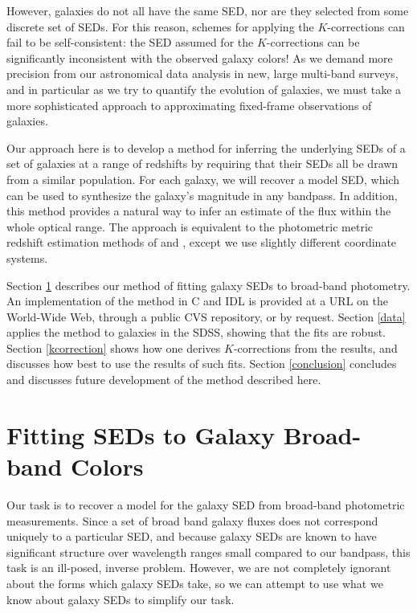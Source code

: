\documentclass[10pt,preprint]{aastex}
\begin{document}
However, galaxies do not all have the same SED, nor are they selected
from some discrete set of SEDs. For this reason, schemes for applying
the $K$-corrections can fail to be self-consistent: the SED assumed
for the $K$-corrections can be significantly inconsistent with the
observed galaxy colors! As we demand more precision from our
astronomical data analysis in new, large multi-band surveys, and in
particular as we try to quantify the evolution of galaxies, we must
take a more sophisticated approach to approximating fixed-frame
observations of galaxies.

Our approach here is to develop a method for inferring the underlying
SEDs of a set of galaxies at a range of redshifts by requiring that
their SEDs all be drawn from a similar population. For each galaxy, we
will recover a model SED, which can be used to synthesize the galaxy's
magnitude in any bandpass. In addition, this method provides a natural
way to infer an estimate of the flux within the whole optical range.
The approach is equivalent to the photometric metric redshift
estimation methods of \citet{csabai99a} and \citet{budavari00a}, 
except we use slightly different coordinate systems.

Section \ref{sedfit} describes our method of fitting galaxy SEDs to
broad-band photometry. An implementation of the method in C and IDL is
provided at a URL on the World-Wide Web, through a public CVS
repository, or by request.  Section \ref{data} applies the method to
galaxies in the SDSS, showing that the fits are robust. Section
\ref{kcorrection} shows how one derives $K$-corrections from the
results, and discusses how best to use the results of such
fits. Section \ref{conclusion} concludes and discusses future
development of the method described here.

\section{Fitting SEDs to Galaxy Broad-band Colors}
\label{sedfit}

Our task is to recover a model for the galaxy SED from broad-band
photometric measurements. Since a set of broad band galaxy fluxes does
not correspond uniquely to a particular SED, and because galaxy SEDs
are known to have significant structure over wavelength ranges small
compared to our bandpass, this task is an ill-posed, inverse
problem. However, we are not completely ignorant about the forms which
galaxy SEDs take, so we can attempt to use what we know about galaxy
SEDs to simplify our task.
\end{document}
